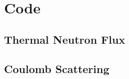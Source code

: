 \appendix
\singlespacing
\section{Code}
\subsection{Thermal Neutron Flux}

\subsection{Coulomb Scattering}
